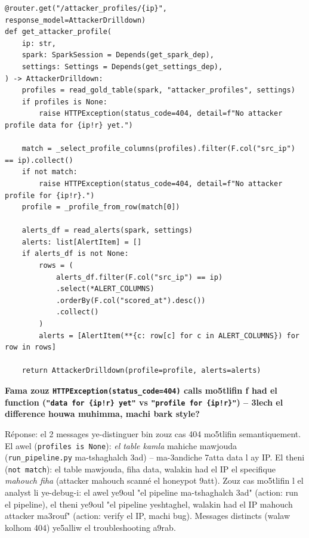 \documentclass[11pt,a4paper]{report}
\DeclareRobustCommand{\code}[1]{\texttt{#1}}
\begin{document}
\begin{lstlisting}[style=pystyle]
@router.get("/attacker_profiles/{ip}", response_model=AttackerDrilldown)
def get_attacker_profile(
    ip: str,
    spark: SparkSession = Depends(get_spark_dep),
    settings: Settings = Depends(get_settings_dep),
) -> AttackerDrilldown:
    profiles = read_gold_table(spark, "attacker_profiles", settings)
    if profiles is None:
        raise HTTPException(status_code=404, detail=f"No attacker profile data for {ip!r} yet.")

    match = _select_profile_columns(profiles).filter(F.col("src_ip") == ip).collect()
    if not match:
        raise HTTPException(status_code=404, detail=f"No attacker profile for {ip!r}.")
    profile = _profile_from_row(match[0])

    alerts_df = read_alerts(spark, settings)
    alerts: list[AlertItem] = []
    if alerts_df is not None:
        rows = (
            alerts_df.filter(F.col("src_ip") == ip)
            .select(*ALERT_COLUMNS)
            .orderBy(F.col("scored_at").desc())
            .collect()
        )
        alerts = [AlertItem(**{c: row[c] for c in ALERT_COLUMNS}) for row in rows]

    return AttackerDrilldown(profile=profile, alerts=alerts)
\end{lstlisting}

\begin{soual}
\textbf{Fama zouz \code{HTTPException(status\_code=404)} calls mo5tlifin
f had el function (\code{"data for \{ip!r\} yet"} vs \code{"profile for
\{ip!r\}"}) -- 3lech el difference houwa muhimma, machi bark style?}

Réponse: el 2 messages ye-distinguer bin zouz cas 404 mo5tlifin
semantiquement. El awel (\code{profiles is None}): \emph{el table kamla}
mahiche mawjouda (\code{run\_pipeline.py} ma-tshaghalch 3ad) -- ma-3andiche
7atta data l ay IP. El theni (\code{not match}): el table mawjouda, fiha
data, walakin had el IP el specifique \emph{mahouch fiha} (attacker
mahouch scanné el honeypot 9att). Zouz cas mo5tlifin l el analyst li
ye-debug-i: el awel ye9oul "el pipeline ma-tshaghalch 3ad" (action: run
el pipeline), el theni ye9oul "el pipeline yeshtaghel, walakin had el IP
mahouch attacker ma3rouf" (action: verify el IP, machi bug). Messages
distincts (walaw kolhom 404) ye5alliw el troubleshooting a9rab.
\end{soual}
\end{document}
